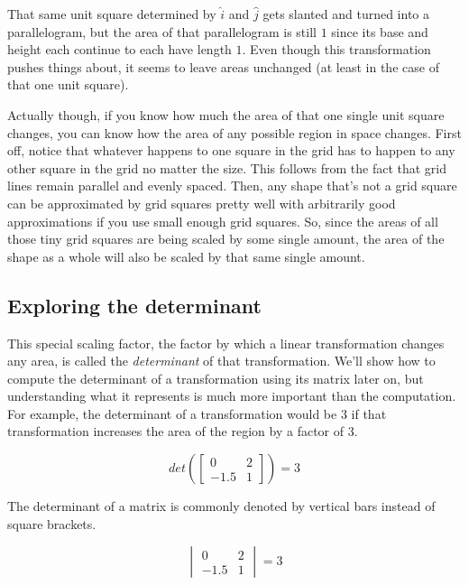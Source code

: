 That same unit square determined by $\hat{i}$ and $\hat{j}$ gets slanted and
turned into a parallelogram, but the area of that parallelogram is still $1$
since its base and height each continue to each have length $1$. Even though
this transformation pushes things about, it seems to leave areas unchanged (at
least in the case of that one unit square).

Actually though, if you know how much the area of that one single unit square
changes, you can know how the area of any possible region in space changes.
First off, notice that whatever happens to one square in the grid has to happen
to any other square in the grid no matter the size. This follows from the fact
that grid lines remain parallel and evenly spaced. Then, any shape that's not a
grid square can be approximated by grid squares pretty well with arbitrarily
good approximations if you use small enough grid squares. So, since the areas of
all those tiny grid squares are being scaled by some single amount, the area of
the shape as a whole will also be scaled by that same single amount.

\subsection{Exploring the determinant}

This special scaling factor, the factor by which a linear transformation changes
any area, is called the \textit{determinant} of that transformation. We'll show
how to compute the determinant of a transformation using its matrix later on,
but understanding what it represents is much more important than the
computation. For example, the determinant of a transformation would be $3$ if
that transformation increases the area of the region by a factor of $3$.

\begin{equation*}
  det\left(\begin{bmatrix}
    0 & 2 \\
    -1.5 & 1
  \end{bmatrix}\right) = 3
\end{equation*}

The determinant of a matrix is commonly denoted by vertical bars instead of
square brackets.

\begin{equation*}
  \begin{vmatrix}
    0 & 2 \\
    -1.5 & 1
  \end{vmatrix} = 3
\end{equation*}

